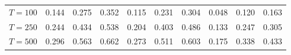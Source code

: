 % 
\begin{tabular}{cccccccccc}
  \hline
  \hline
$T = 100$ & 0.144 & 0.275 & 0.352 & 0.115 & 0.231 & 0.304 & 0.048 & 0.120 & 0.163 \\ 
  $T = 250$ & 0.244 & 0.434 & 0.538 & 0.204 & 0.403 & 0.486 & 0.133 & 0.247 & 0.305 \\ 
  $T = 500$ & 0.296 & 0.563 & 0.662 & 0.273 & 0.511 & 0.603 & 0.175 & 0.338 & 0.433 \\ 
   \hline
\end{tabular}
